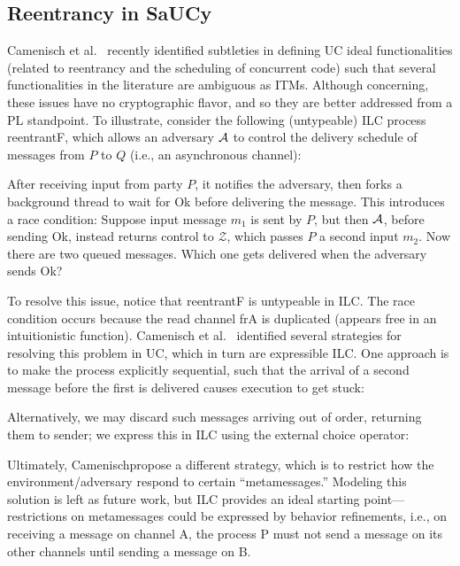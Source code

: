 \subsection{Reentrancy in SaUCy}
\label{subsec:reentrancy}

Camenisch et al.~\cite{camenisch2016universal} recently identified subtleties in
defining UC ideal functionalities (related to reentrancy and the scheduling of
concurrent code) such that several functionalities in the literature are
ambiguous as ITMs. Although concerning, these issues have no cryptographic
flavor, and so they are better addressed from a PL standpoint.  To illustrate,
consider the following (untypeable) ILC process \textsf{reentrantF}, which
allows an adversary $\mathcal{{A}}$ to control the delivery schedule of messages from
$P$ to $Q$ (i.e., an asynchronous channel):



After receiving input from party $P$, it notifies the adversary, then forks a
background thread to wait for \textsf{Ok} before delivering the message.  This
introduces a race condition: Suppose input message $m_1$ is sent by $P$, but
then $\mathcal{{A}}$, before sending \textsf{Ok}, instead returns control to $\mathcal
Z$, which passes $P$ a second input $m_2$. Now there are two queued
messages. Which one gets delivered when the adversary sends \textsf{Ok}?

To resolve this issue, notice that \textsf{reentrantF} is untypeable in ILC.
The race condition occurs because the read channel \textsf{frA} is duplicated
(appears free in an intuitionistic function).  Camenisch et
al.~\cite{camenisch2016universal} identified several strategies for resolving
this problem in UC, which in turn are expressible ILC. One approach is to make
the process explicitly sequential, such that the arrival of a second message
before the first is delivered causes execution to get stuck:

Alternatively, we may discard such messages arriving out of order, returning
them to sender; we express this in ILC using the external choice operator:


Ultimately, Camenisch\etal propose a different strategy, which is to restrict
how the environment/adversary respond to certain ``metamessages.''
 Modeling this solution is left as future work, but ILC
provides an ideal starting point---restrictions on metamessages could be expressed
by behavior refinements, i.e., on receiving a message on channel A, the process
P must not send a message on its other channels until sending a message on B.
